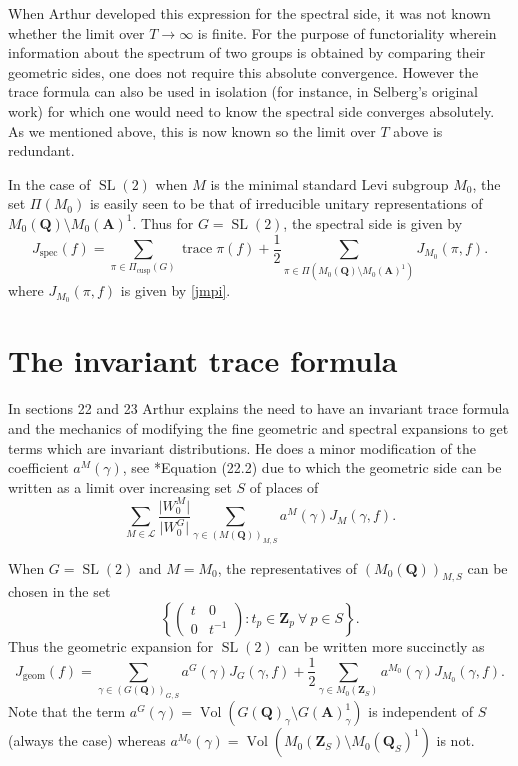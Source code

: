 \documentclass[11pt]{amsart}
\def\A{\mathbf A}
\def\Q{\mathbf Q}
\def\Z{\mathbf Z}
\def\LLL{\mathcal L}
\def\bs{\setminus}
\def\mod#1{\lvert #1 \rvert} %
\def\sl{\operatorname{SL}}
\def\trace{\operatorname{trace}}
\def\vol{\operatorname{Vol}}
\theoremstyle{remark}
\begin{document}
When Arthur developed this expression for the spectral side, it was not known whether the limit over $T \to \infty$ is finite. For the purpose of functoriality wherein information about the spectrum of two groups is obtained by comparing their geometric sides, one does not require this absolute convergence. However the trace formula can also be used in isolation (for instance, in Selberg's original work) for which one would need to know the spectral side converges absolutely. As we mentioned above, this is now known \cite{FLM} so the limit over $T$ above is redundant. 

In the case of $\sl(2)$ when $M$ is the minimal standard Levi subgroup $M_0$, the set $\Pi(M_0)$ is easily seen to be that of irreducible unitary representations of $M_0(\Q)\bs M_0(\A)^1$. Thus for $G = \sl(2)$, the spectral side is given by
\begin{equation} \label{spec}
	J_{\text{spec}}(f) = \sum_{\pi \in \Pi_{\text{cusp}}(G)} \trace \pi(f) + \frac{1}{2}
		\sum_{\pi \in \Pi(M_0(\Q)\bs M_0(\A)^1)} J_{M_0}(\pi, f). 
\end{equation}
where $J_{M_0}(\pi, f)$ is given by \cref{jmpi}. 

\section{The invariant trace formula}

In sections 22 and 23 Arthur explains the need to have an invariant trace formula and the mechanics of modifying the fine geometric and spectral expansions to get terms which are invariant distributions. He does a minor modification of the coefficient $a^M(\gamma)$, see \cite{clay}*{Equation (22.2)} due to which the geometric side can be written as a limit over increasing set $S$ of places of
\[ \sum_{M \in \LLL} \frac{\mod{W_0^M}}{\mod{W_0^G}} \sum_{\gamma \in (M(\Q))_{M, S}} a^M(\gamma) J_M(\gamma, f). \]

When $G=\sl(2)$ and $M=M_0$, the representatives of $(M_0(\Q))_{M, S}$ can be chosen in the set 
\[ \left \{ \begin{pmatrix} t & 0 \\ 0 & t^{-1} \end{pmatrix} : t_p \in \Z_p \ \forall \ p \in S \right \}. \]
Thus the geometric expansion for $\sl(2)$ can be written more succinctly as  
\[ J_{\text{geom}}(f) = \sum_{\gamma \in (G(\Q))_{G, S}} a^G(\gamma) J_G(\gamma, f) + 
		\frac{1}{2} \sum_{\gamma \in M_0(\Z_S)} a^{M_0}(\gamma) J_{M_0}(\gamma, f). \]
Note that the term $a^G(\gamma) = \vol(G(\Q)_\gamma \bs G(\A)^1_\gamma)$ is independent of $S$ (always the case) whereas $a^{M_0}(\gamma) = \vol (M_0(\Z_S)\bs M_0(\Q_S)^1)$ is not. 
\end{document}
